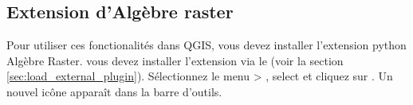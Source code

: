 \subsection{Extension d'Algèbre raster}\label{sec:ftools}


Pour utiliser ces fonctionalités dans QGIS, vous devez installer l'extension python Algèbre Raster. vous devez installer l'extension via le  (voir la section \ref{sec:load_external_plugin}). Sélectionnez le menu  > , select  et cliquez sur . Un nouvel icône  apparaît dans la barre d'outils.
